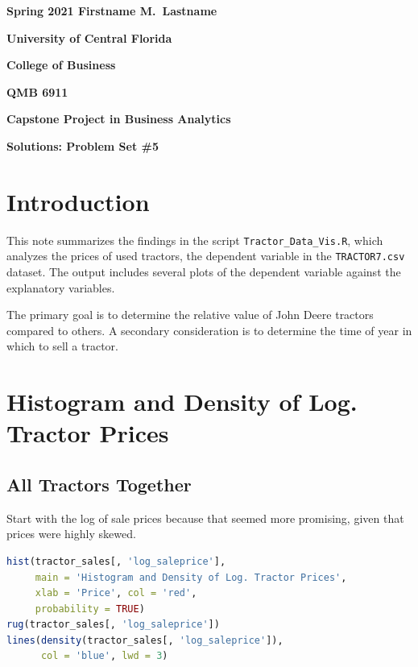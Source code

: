 \documentclass[11pt]{book}
\begin{document}

\pagestyle{empty}
{\noindent\bf Spring 2021 \hfill Firstname M.~Lastname}
\vskip 16pt
\centerline{\bf University of Central Florida}
\centerline{\bf College of Business}
\vskip 16pt
\centerline{\bf QMB 6911}
\centerline{\bf Capstone Project in Business Analytics}
\vskip 10pt
\centerline{\bf Solutions:  Problem Set \#5}
\vskip 32pt
\noindent

\section{Introduction}

This note summarizes the findings in the script
\texttt{Tractor\_Data\_Vis.R},
which analyzes the prices of used tractors,
the dependent variable in the \texttt{TRACTOR7.csv} dataset.
The output includes several plots of the
dependent variable against the explanatory variables.

The primary goal is to determine the relative value of John Deere tractors compared to others.
A secondary consideration is to determine the time of year in which to
sell a tractor.

\vfill
\pagebreak
\section{Histogram and Density of Log. Tractor Prices}


\subsection{All Tractors Together}

Start with the log of sale prices because that
seemed more promising, given that prices were highly skewed.

\begin{lstlisting}[language=R]
hist(tractor_sales[, 'log_saleprice'],
     main = 'Histogram and Density of Log. Tractor Prices',
     xlab = 'Price', col = 'red',
     probability = TRUE)
rug(tractor_sales[, 'log_saleprice'])
lines(density(tractor_sales[, 'log_saleprice']),
      col = 'blue', lwd = 3)
\end{lstlisting}
\end{document}
